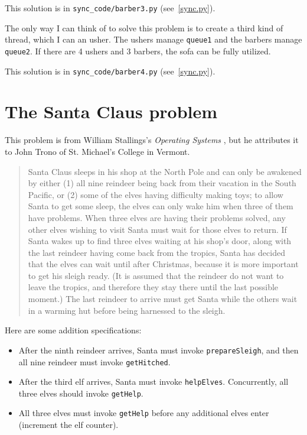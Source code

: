\documentclass{book}
\newcommand{\clearemptydoublepage}{\newpage\cleardoublepage}
\begin{document}
This solution is in \verb"sync_code/barber3.py" (see~\ref{sync.py}).

The only way I can think of to solve this problem is to create a third
kind of thread, which I can an usher.  The ushers manage {\tt queue1}
and the barbers manage {\tt queue2}.  If there are 4 ushers and 3 barbers,
the sofa can be fully utilized.

This solution is in \verb"sync_code/barber4.py" (see~\ref{sync.py}).


\clearemptydoublepage
\section{The Santa Claus problem}

This problem is from William Stallings's
{\em Operating Systems} \cite{stallings},
but he attributes it to John Trono of St. Michael's College in
Vermont.

\begin{quotation}
Santa Claus sleeps in his shop at the North Pole and can only be
awakened by either (1) all nine reindeer being back from their
vacation in the South Pacific, or (2) some of the elves having
difficulty making toys; to allow Santa to get some sleep, the elves
can only wake him when three of them have problems.  When three elves
are having their problems solved, any other elves wishing to visit
Santa must wait for those elves to return.  If Santa wakes up to find
three elves waiting at his shop's door, along with the last reindeer
having come back from the tropics, Santa has decided that the elves can
wait until after Christmas, because it is more important to get his
sleigh ready.  (It is assumed that the reindeer do not want to leave
the tropics, and therefore they stay there until the last possible
moment.)  The last reindeer to arrive must get Santa while the others
wait in a warming hut before being harnessed to the sleigh.
\end{quotation}

Here are some addition specifications:

\begin {itemize}

\item After the ninth reindeer arrives, Santa must invoke 
{\tt prepareSleigh}, and then all nine reindeer must
invoke {\tt getHitched}.

\item After the third elf arrives, Santa must invoke {\tt helpElves}.
Concurrently, all three elves should invoke {\tt getHelp}.

\item All three elves must invoke {\tt getHelp} before any additional
elves enter (increment the elf counter).

\end {itemize}
\end{document}
